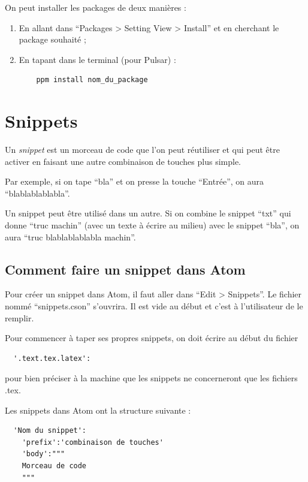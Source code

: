 \documentclass[french]{article}
\theoremstyle{definition}
\theoremstyle{remark}
\begin{document}
On peut installer les packages de deux manières :

\begin{enumerate}
  \item En allant dans ``Packages > Setting View > Install'' et en cherchant le package souhaité ;
  \item En tapant dans le terminal (pour Pulsar) :

  \begin{verbatim}
    ppm install nom_du_package
  \end{verbatim}
\end{enumerate}

\section{Snippets} \label{snippets}

Un \emph{snippet} est un morceau de code que l'on peut réutiliser et qui peut être activer en faisant une autre combinaison de touches plus simple.

Par exemple, si on tape ``bla'' et on presse la touche ``Entrée'', on aura ``blablablablabla''.

Un snippet peut être utilisé dans un autre. Si on combine le snippet ``txt'' qui donne ``truc  machin'' (avec un texte à écrire au milieu) avec le snippet ``bla'', on aura ``truc blablablablabla machin''.

\subsection{Comment faire un snippet dans Atom}

Pour créer un snippet dans Atom, il faut aller dans ``Edit > Snippets''. Le fichier nommé ``snippets.cson'' s'ouvrira. Il est vide au début et c'est à l'utilisateur de le remplir.

Pour commencer à taper ses propres snippets, on doit écrire au début du fichier

\begin{verbatim}
  '.text.tex.latex':
\end{verbatim}

pour bien préciser à la machine que les snippets ne concerneront que les fichiers .tex.

Les snippets dans Atom ont la structure suivante :

\begin{verbatim}
  'Nom du snippet':
    'prefix':'combinaison de touches'
    'body':"""
    Morceau de code
    """
\end{verbatim}
\end{document}
